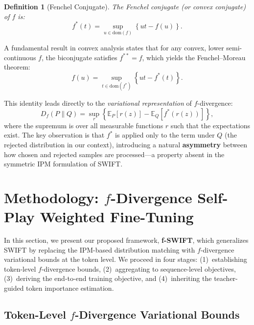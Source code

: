 \documentclass[11pt,a4paper]{article}
\newtheorem{definition}[theorem]{Definition}
\newcommand{\E}{\mathbb{E}}
\newcommand{\Df}{D_f}
\begin{document}
\begin{definition}[Fenchel Conjugate]
\label{def:fenchel}
The Fenchel conjugate (or convex conjugate) of $f$ is:
\begin{equation}
    f^*(t) = \sup_{u \in \mathrm{dom}(f)} \left\{ ut - f(u) \right\}.
    \label{eq:fenchel}
\end{equation}
\end{definition}

A fundamental result in convex analysis states that for any convex, lower semi-continuous $f$, the biconjugate satisfies $f^{**} = f$, which yields the Fenchel--Moreau theorem:
\begin{equation}
    f(u) = \sup_{t \in \mathrm{dom}(f^*)} \left\{ ut - f^*(t) \right\}.
    \label{eq:biconjugate}
\end{equation}

This identity leads directly to the \emph{variational representation} of $f$-divergence:
\begin{equation}
    \Df(P \| Q) = \sup_{r} \left\{ \E_P[r(z)] - \E_Q[f^*(r(z))] \right\},
    \label{eq:variational}
\end{equation}
where the supremum is over all measurable functions $r$ such that the expectations exist. The key observation is that $f^*$ is applied only to the term under $Q$ (the rejected distribution in our context), introducing a natural \textbf{asymmetry} between how chosen and rejected samples are processed---a property absent in the symmetric IPM formulation of SWIFT.


\section{Methodology: $f$-Divergence Self-Play Weighted Fine-Tuning}
\label{sec:method}

In this section, we present our proposed framework, \textbf{f-SWIFT}, which generalizes SWIFT by replacing the IPM-based distribution matching with $f$-divergence variational bounds at the token level. We proceed in four stages: (1)~establishing token-level $f$-divergence bounds, (2)~aggregating to sequence-level objectives, (3)~deriving the end-to-end training objective, and (4)~inheriting the teacher-guided token importance estimation.

\subsection{Token-Level $f$-Divergence Variational Bounds}
\label{subsec:token_f_div}
\end{document}
